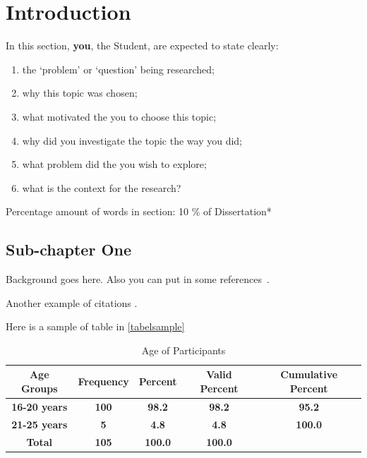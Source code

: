 
\chapter{Introduction}
\begin{spacing}{2.0}

In this section, \textbf{you}, the Student, are expected to state clearly:
\begin{enumerate}[label=(\alph*)]
    \item the `problem’ or `question’ being researched;
    \item why this topic was chosen;
    \item what motivated the you to choose this topic;
    \item why did you investigate the topic the way you did;
    \item what problem did the you wish to explore;
    \item what is the context for the research?
\end{enumerate}
Percentage amount of words in section: 10 \% of Dissertation*

\section{Sub-chapter One}


Background goes here. Also you can put in some references~\cite{ronneberger2015unet}.

Another example of citations \cite{latex2e,ronneberger2015unet,smith2020deep}.

Here is a sample of table in \autoref{tabelsample}


\begin{table}[ht]
\centering
{}
{\def\arraystretch{1.5}
    \begin{tabular}{|c|c|c|c|c|} 
    \hline
    
    \textbf{Age Groups}  & \textbf{Frequency} & \textbf{Percent} & \textbf{Valid Percent} & \textbf{Cumulative Percent}  \\[5pt]
    
    \hline 
    \textbf{16-20 years} & \textbf{100}       & \textbf{98.2}    & \textbf{98.2}          & \textbf{95.2}                \\ 
    \hline
    \textbf{21-25 years} & \textbf{5}         & \textbf{4.8}     & \textbf{4.8}           & \textbf{100.0}               \\ 
    \hline
    \textbf{Total}       & \textbf{105}       & \textbf{100.0}   & \textbf{100.0}         &                              \\
    \hline
    \end{tabular}
}
\caption{Age of Participants}
\label{tabelsample}
\end{table}




\end{spacing}

